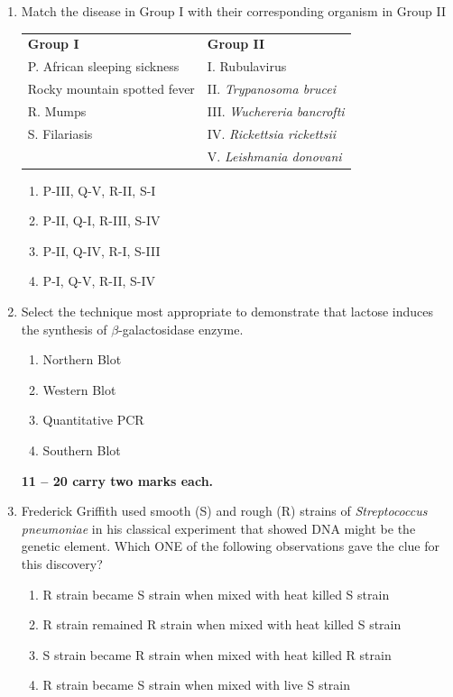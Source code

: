 \documentclass[journal,12pt,onecolumn]{IEEEtran}
\begin{document}
\begin{enumerate}[label=\arabic*.]
\item Match the disease in Group I with their corresponding organism in Group II
\begin{center}
\begin{tabular}{p{6cm}p{6cm}}
\textbf{Group I} & \textbf{Group II} \\
P. African sleeping sickness & I. Rubulavirus \\
 Rocky mountain spotted fever & II. \textit{Trypanosoma brucei} \\
R. Mumps & III. \textit{Wuchereria bancrofti} \\
S. Filariasis & IV. \textit{Rickettsia rickettsii} \\
& V. \textit{Leishmania donovani} \\
\end{tabular}
\end{center}
\begin{multicols}{2}
\begin{enumerate}[label=(\Alph*)]
\item P-III, Q-V, R-II, S-I
\item P-II, Q-I, R-III, S-IV
\item P-II, Q-IV, R-I, S-III
\item P-I, Q-V, R-II, S-IV
\end{enumerate}
\end{multicols}

\item Select the technique most appropriate to demonstrate that lactose induces the synthesis of $\beta$-galactosidase enzyme.
\begin{multicols}{2}
\begin{enumerate}[label=(\Alph*)]
\item Northern Blot
\item Western Blot
\item Quantitative PCR
\item Southern Blot
\end{enumerate}
\end{multicols}

\noindent \textbf{ 11 --  20 carry two marks each.}
\item Frederick Griffith used smooth (S) and rough (R) strains of \textit{Streptococcus pneumoniae} in his classical experiment that showed DNA might be the genetic element. Which ONE of the following observations gave the clue for this discovery?
\begin{enumerate}[label=(\Alph*)]
\item R strain became S strain when mixed with heat killed S strain
\item R strain remained R strain when mixed with heat killed S strain
\item S strain became R strain when mixed with heat killed R strain
\item R strain became S strain when mixed with live S strain
\end{enumerate}


\end{enumerate}
\end{document}
